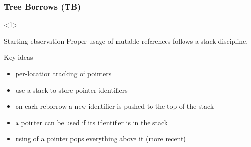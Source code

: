 \begin{frame}[fragile, t]
\begin{minipage}{0.3\textwidth}
\begin{block}{}
        \end{block}
    \end{minipage}
\end{frame}

\begin{frame}[t]
    \frametitle{ Tree Borrows (TB)}
    \begin{onlyenv}<1>
        \begin{block}{Starting observation}
            Proper usage of mutable references follows a stack discipline.
        \end{block}
        \begin{block}{Key ideas}
            \begin{itemize}
                \item per-location tracking of pointers
                \item use a stack to store pointer identifiers
                \item on each reborrow a new identifier is pushed to the top of the stack
                \item a pointer can be used if its identifier is in the stack
                \item using of a pointer pops everything above it (more recent)
            \end{itemize}
        \end{block}
    \end{onlyenv}


\end{frame}
